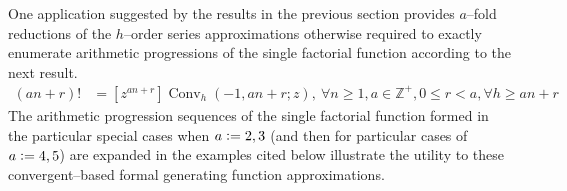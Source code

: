 \documentclass[12pt,reqno]{article}
\numberwithin{sfootnote}{section}
\numberwithin{equation}{section}
\theoremstyle{DefaultTheoremStyle}
\theoremstyle{definition}
\newcommand{\defequals}{\ensuremath{\vcentcolon=}}
\newcommand{\ConvGF}[4]{\ensuremath{\Conv_{#1}\left(#2, #3; #4\right)}}
\DeclareMathOperator{\Conv}{Conv}
\begin{document}
One application suggested by the results in the previous section 
provides $a$--fold reductions of the 
$h$--order series approximations otherwise required to 
exactly enumerate 
arithmetic progressions of the single factorial function according to the 
next result. 
\begin{align} 
\label{eqn_AKPlusB_FactFn_Conv_Ident-stmt_v1} 
\left(an+r\right)! & = 
     [z^{an+r}] \ConvGF{h}{-1}{an+r}{z},\ 
     \forall n \geq 1, a \in \mathbb{Z}^{+}, 0 \leq r < a, 
     \forall h \geq an+r 
\end{align} 
The arithmetic progression sequences of the single factorial function 
formed in the 
particular special cases when $a \defequals 2, 3$ 
(and then for particular cases of $a \defequals 4,5$) 
are expanded in the 
examples cited below illustrate the utility to these convergent--based 
formal generating function approximations. 
\end{document}
